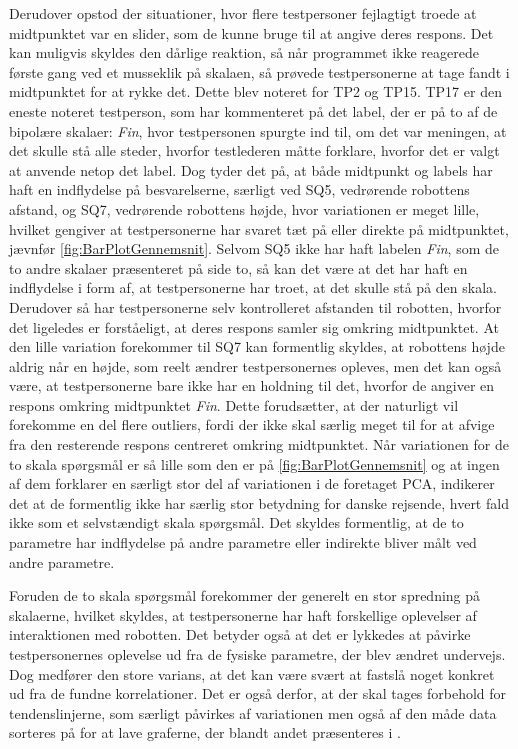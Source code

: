 Derudover opstod der situationer, hvor flere testpersoner fejlagtigt troede at midtpunktet var en slider, som de kunne bruge til at angive deres respons. Det kan muligvis skyldes den dårlige reaktion, så når programmet ikke reagerede første gang ved et musseklik på skalaen, så prøvede testpersonerne at tage fandt i midtpunktet for at rykke det. Dette blev noteret for TP2 og TP15.\blankline 
%
TP17 er den eneste noteret testperson, som har kommenteret på det label, der er på to af de bipolære skalaer: \textit{Fin}, hvor testpersonen spurgte ind til, om det var meningen, at det skulle stå alle steder, hvorfor testlederen måtte forklare, hvorfor det er valgt at anvende netop det label. Dog tyder det på, at både midtpunkt og labels har haft en indflydelse på besvarelserne, særligt ved SQ5, vedrørende robottens afstand, og SQ7, vedrørende robottens højde, hvor variationen er meget lille, hvilket gengiver at testpersonerne har svaret tæt på eller direkte på midtpunktet, jævnfør \autoref{fig:BarPlotGennemsnit}. Selvom SQ5 ikke har haft labelen \textit{Fin}, som de to andre skalaer præsenteret på side to, så kan det være at det har haft en indflydelse i form af, at testpersonerne har troet, at det skulle stå på den skala. Derudover så har testpersonerne selv kontrolleret afstanden til robotten, hvorfor det ligeledes er forståeligt, at deres respons samler sig omkring midtpunktet. At den lille variation forekommer til SQ7 kan formentlig skyldes, at robottens højde aldrig når en højde, som reelt ændrer testpersonernes opleves, men det kan også være, at testpersonerne bare ikke har en holdning til det, hvorfor de angiver en respons omkring midtpunktet \textit{Fin}. Dette forudsætter, at der naturligt vil forekomme en del flere outliers, fordi der ikke skal særlig meget til for at afvige fra den resterende respons centreret omkring midtpunktet. Når variationen for de to skala spørgsmål er så lille som den er på \autoref{fig:BarPlotGennemsnit} og at ingen af dem forklarer en særligt stor del af variationen i de foretaget PCA, indikerer det at de formentlig ikke har særlig stor betydning for danske rejsende, hvert fald ikke som et selvstændigt skala spørgsmål. Det skyldes formentlig, at de to parametre har indflydelse på andre parametre eller indirekte bliver målt ved andre parametre. 

Foruden de to skala spørgsmål forekommer der generelt en stor spredning på skalaerne, hvilket skyldes, at testpersonerne har haft forskellige oplevelser af interaktionen med robotten. Det betyder også at det er lykkedes at påvirke testpersonernes oplevelse ud fra de fysiske parametre, der blev ændret undervejs. Dog medfører den store varians, at det kan være svært at fastslå noget konkret ud fra de fundne korrelationer. Det er også derfor, at der skal tages forbehold for tendenslinjerne, som særligt påvirkes af variationen men også af den måde data sorteres på for at lave graferne, der blandt andet præsenteres i . 
%



